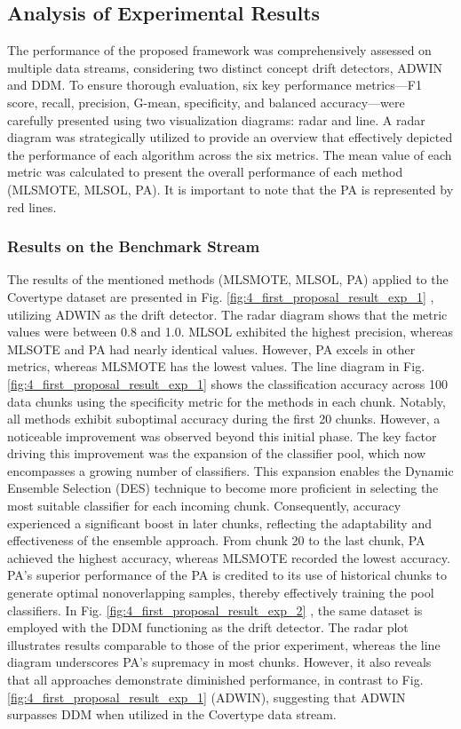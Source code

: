 \subsection{Analysis of Experimental Results}
The performance of the proposed framework was comprehensively assessed on multiple data streams, considering two distinct concept drift detectors, ADWIN and DDM. To ensure thorough evaluation, six key performance metrics—F1 score, recall, precision, G-mean, specificity, and balanced accuracy—were carefully presented using two visualization diagrams: radar and line. A radar diagram was strategically utilized to provide an overview that effectively depicted the performance of each algorithm across the six metrics. The mean value of each metric was calculated to present the overall performance of each method (MLSMOTE, MLSOL, PA). It is important to note that the PA is represented by red lines.
\subsubsection{Results on the Benchmark Stream}
The results of the mentioned methods (MLSMOTE, MLSOL, PA) applied to the Covertype dataset are presented in Fig. \ref{fig:4_first_proposal_result_exp_1}
, utilizing ADWIN as the drift detector. The radar diagram shows that the metric values were between 0.8 and 1.0. MLSOL exhibited the highest precision, whereas MLSOTE and PA had nearly identical values. However, PA excels in other metrics, whereas MLSMOTE has the lowest values. The line diagram in Fig. \ref{fig:4_first_proposal_result_exp_1}
shows the classification accuracy across 100 data chunks using the specificity metric for the methods in each chunk. Notably, all methods exhibit suboptimal accuracy during the first 20 chunks. However, a noticeable improvement was observed beyond this initial phase. The key factor driving this improvement was the expansion of the classifier pool, which now encompasses a growing number of classifiers. This expansion enables the Dynamic Ensemble Selection (DES) technique to become more proficient in selecting the most suitable classifier for each incoming chunk. Consequently, accuracy experienced a significant boost in later chunks, reflecting the adaptability and effectiveness of the ensemble approach. From chunk 20 to the last chunk, PA achieved the highest accuracy, whereas MLSMOTE recorded the lowest accuracy. PA's superior performance of the PA is credited to its use of historical chunks to generate optimal nonoverlapping samples, thereby effectively training the pool classifiers. In Fig. \ref{fig:4_first_proposal_result_exp_2}
, the same dataset is employed with the DDM functioning as the drift detector. The radar plot illustrates results comparable to those of the prior experiment, whereas the line diagram underscores PA's supremacy in most chunks. However, it also reveals that all approaches demonstrate diminished performance, in contrast to Fig. \ref{fig:4_first_proposal_result_exp_1} (ADWIN), suggesting that ADWIN surpasses DDM when utilized in the Covertype data stream.


